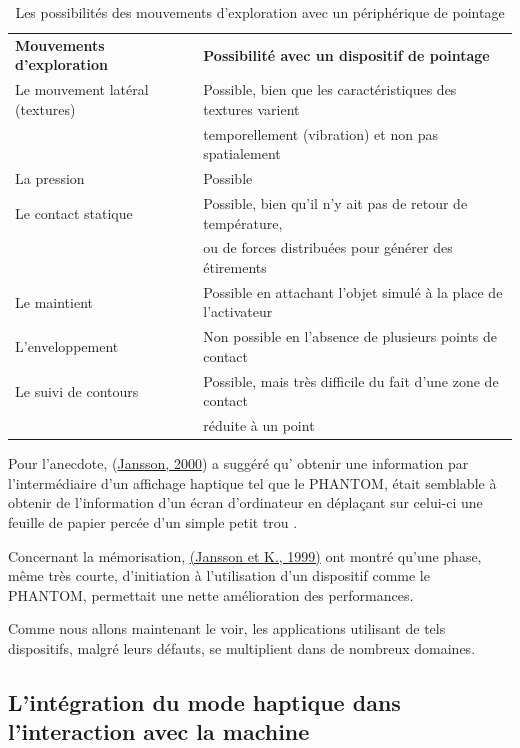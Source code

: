 \documentclass[
]{book}
\begin{document}
\begin{longtable}[]{@{}
  >{\raggedright\arraybackslash}p{}
  >{\raggedright\arraybackslash}p{}@{}}
\caption{\label{tab:possibilite} Les possibilités des mouvements d'exploration avec un
périphérique de pointage}\tabularnewline
\toprule()
\endhead
\textbf{Mouvements d'exploration} & \textbf{Possibilité avec un dispositif de pointage} \\
Le mouvement latéral (textures) & Possible, bien que les caractéristiques des textures varient \\
& temporellement (vibration) et non pas spatialement \\
La pression & Possible \\
Le contact statique & Possible, bien qu'il n'y ait pas de retour de température, \\
& ou de forces distribuées pour générer des étirements \\
Le maintient & Possible en attachant l'objet simulé à la place de l'activateur \\
L'enveloppement & Non possible en l'absence de plusieurs points de contact \\
Le suivi de contours & Possible, mais très difficile du fait d'une zone de contact \\
& réduite à un point \\
\bottomrule()
\end{longtable}

Pour l'anecdote, (\protect\hyperlink{ref-jansson2000haptic}{Jansson, 2000}) a
suggéré qu' obtenir une information par l'intermédiaire d'un affichage
haptique tel que le PHANTOM, était semblable à obtenir de l'information d'un
écran d'ordinateur en déplaçant sur celui-ci une feuille de papier percée
d'un simple petit trou .

Concernant la mémorisation, \href{047-bibliographie.html\#Jansson1999}{(Jansson et
K., 1999)} ont montré qu'une phase, même très courte, d'initiation à
l'utilisation d'un dispositif comme le PHANTOM, permettait une nette
amélioration des performances.

Comme nous allons maintenant le voir, les applications utilisant de tels
dispositifs, malgré leurs défauts, se multiplient dans de nombreux
domaines.

\hypertarget{lintuxe9gration-du-mode-haptique-dans-linteraction-avec-la-machine}{%
\subsection{L'intégration du mode haptique dans l'interaction avec la machine}\label{lintuxe9gration-du-mode-haptique-dans-linteraction-avec-la-machine}}
\end{document}
